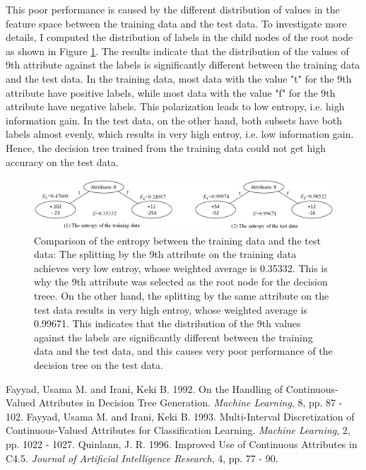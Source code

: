 \begin{enumerate}
This poor performance is caused by the different distribution of values in the feature space between the training data and the test data. To investigate more details, I computed the distribution of labels in the child nodes of the root node as shown in Figure \ref{fig:comparison}. The results indicate that the distribution of the values of 9th attribute against the labels is significantly different between the training data and the test data. In the training data, most data with the value "t" for the 9th attribute have positive labels, while most data with the value "f" for the 9th attribute have negative labels. This polarization leads to low entropy, i.e. high information gain. In the test data, on the other hand, both subsets have both labels almost evenly, which results in very high entroy, i.e. low information gain. Hence, the decision tree trained from the training data could not get high accuracy on the test data.

\begin{figure}[hbtp]
\centering
\includegraphics[width=150mm]{figure2.png}
\caption{Comparison of the entropy between the training data and the test data: The splitting by the 9th attribute on the training data achieves very low entroy, whose weighted average is 0.35332. This is why the 9th attribute was selected as the root node for the decision treee. On the other hand, the splitting by the same attribute on the test data results in very high entroy, whose weighted average is 0.99671. This indicates that the distribution of the 9th values against the labels are significantly different between the training data and the test data, and this causes very poor performance of the decision tree on the test data.}
\label{fig:comparison}
\end{figure}

\end{enumerate}

\begin{thebibliography}{9}
 Fayyad, Usama M. and Irani, Keki B. 1992. On the Handling of Continuous-Valued Attributes in Decision Tree Generation. {\it Machine Learning}, 8, pp. 87 - 102.
 Fayyad, Usama M. and Irani, Keki B. 1993. Multi-Interval Discretization of Continuous-Valued Attributes for Classification Learning. {\it Machine Learning}, 2, pp. 1022 - 1027.
 Quinlann, J. R. 1996. Improved Use of Continuous Attributes in C4.5. {\it Journal of Artificial Intelligence Research}, 4, pp. 77 - 90.
\end{thebibliography}



